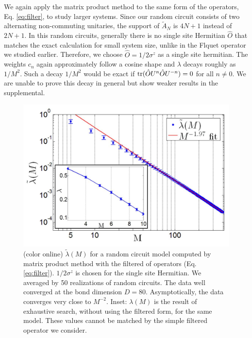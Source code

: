 \documentclass[twocolumn,superscriptaddress, prb]{revtex4-1}
\begin{document}
We again apply the matrix product method to the same form of the operators, Eq. \eqref{eq:filter},
to study larger systems. Since our random circuit consists of two alternating non-commuting unitaries, 
the support of $\tilde{A}_N$ is $4N+1$ instead of $2N+1$.  
In this random circuits, generally there is no single site Hermitian $\hat{O}$  
that matches the exact calculation for small system size, unlike in the Flquet operator we studied earlier. 
Therefore, we choose $\hat{O} = 1/2\sigma^z$ as a single site hermitian.
The weights $c_n$ again approximately follow a cosine shape and $\lambda$ decays roughly as $1/M^2$.
Such a decay $1/M^2$ would be exact if
${\rm tr}(\hat{O} U^n \hat{O} U^{- n})=0$ for all $n \neq 0$.
We are unable to prove this decay in general but show weaker results in the supplemental.




\begin{figure}
\includegraphics[width=1.0\linewidth]{fig_random_circuit.pdf}
\centering
\caption{ (color online)  $\tilde{\lambda}(M)$ for a random circuit model computed by matrix product method with the filtered of operators (Eq. \eqref{eq:filter}). $1/2\sigma^z$ is chosen for the single site Hermitian. We averaged by 50 realizations of random circuits. The data well converged at the bond dimension $D = 80$. Asymptotically, the data converges very close to $M^{-2}$.
Inset: $\lambda(M)$ is the result of exhaustive search, without using the filtered form, for the same model.
These values cannot be matched by the simple filtered operator we consider.}
\label{fig:random_circuit}
\end{figure}
\end{document}
